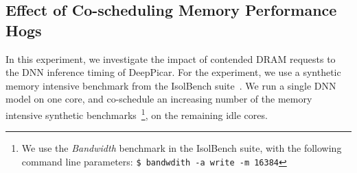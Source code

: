 

\subsection{Effect of Co-scheduling Memory Performance Hogs}\label{sec:eval-memhog}

In this experiment, we investigate the impact of contended DRAM
requests to the DNN inference timing of DeepPicar.
For the experiment, we use a synthetic memory
intensive benchmark from the IsolBench suite~\cite{Valsan2016}.
We run a single DNN model on one core, and
co-schedule an increasing number of the memory intensive synthetic
benchmarks~\footnote{We use the \emph{Bandwidth} benchmark in the
  IsolBench suite, with the following command line parameters: \texttt{\$
  bandwdith -a write -m 16384}}, on the remaining idle cores.

